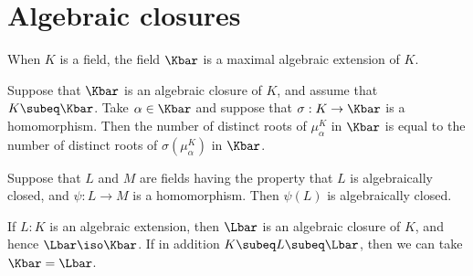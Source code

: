 \documentclass[a4paper]{article}
\begin{document}
\section{Algebraic closures}


\begin{tcorollary}
  When \( K \) is a field, the field \( \Kbar \) is a maximal algebraic extension of \( K \).
\end{tcorollary}


\begin{tcorollary}
  Suppose that \( \Kbar \) is an algebraic closure of \( K \), and assume that \( K\subeq \Kbar \).
  Take \( \alpha\in \Kbar \) and suppose that \( \sigma:K\to \Kbar \) is a homomorphism.
  Then the number of distinct roots of \( \mu_\alpha^K \) in \( \Kbar \) is equal to the number of distinct roots of \( \sigma(\mu_\alpha^K) \) in \( \Kbar \).
\end{tcorollary}

\begin{tproposition}
  Suppose that \( L \) and \( M \) are fields having the property that \( L \) is algebraically closed, and \( \psi : L \to M \) is a homomorphism.
  Then \( \psi(L) \) is algebraically closed.
\end{tproposition}

\begin{tproposition}
  If \( L:K \) is an algebraic extension, then \( \Lbar \) is an algebraic closure of \( K \), and hence \( \Lbar\iso\Kbar \).
  If in addition \( K\subeq L\subeq \Lbar \), then we can take \( \Kbar = \Lbar \).
\end{tproposition}
\end{document}
